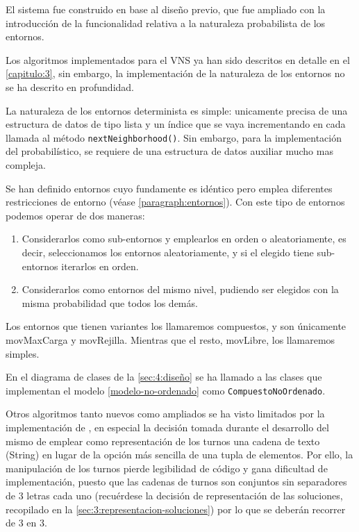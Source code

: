 El sistema fue construido en base al diseño previo, que fue ampliado con la introducción de la funcionalidad relativa a la naturaleza probabilista de los entornos.

Los algoritmos implementados para el VNS ya han sido descritos en detalle en el \autoref{capitulo:3}, sin embargo, la implementación de la naturaleza de los entornos no se ha descrito en profundidad.

La naturaleza de los entornos determinista es simple: unicamente precisa de una estructura de datos de tipo lista y un índice que se vaya incrementando en cada llamada al método \texttt{nextNeighborhood()}. Sin embargo, para la implementación del probabilístico, se requiere de una estructura de datos auxiliar mucho mas compleja.

Se han definido entornos cuyo fundamente es idéntico pero emplea diferentes restricciones de entorno (véase \autoref{paragraph:entornos}). Con este tipo de entornos podemos operar de dos maneras: 
\begin{enumerate}[label={(\Alph*)}]
	\item Considerarlos como sub-entornos y emplearlos en orden o aleatoriamente, es decir, seleccionamos los entornos aleatoriamente, y si el elegido tiene sub-entornos iterarlos en orden.
	\item \label{modelo-no-ordenado} Considerarlos como entornos del mismo nivel, pudiendo ser elegidos con la misma probabilidad que todos los demás.
\end{enumerate}

Los entornos que tienen variantes los llamaremos compuestos, y son únicamente movMaxCarga y movRejilla. Mientras que el resto, movLibre, los llamaremos simples.

En el diagrama de clases de la \autoref{sec:4:diseño} se ha llamado a las clases que implementan el modelo \ref{modelo-no-ordenado} como \texttt{CompuestoNoOrdenado}.

Otros algoritmos tanto nuevos como ampliados se ha visto limitados por la implementación de \legacy{}, en especial la decisión tomada durante el desarrollo del mismo de emplear como representación de los turnos una cadena de texto (String) en lugar de la opción más sencilla de una tupla de elementos. Por ello, la manipulación de los turnos pierde legibilidad de código y gana dificultad de implementación, puesto que las cadenas de turnos son conjuntos sin separadores de 3 letras cada uno (recuérdese la decisión de representación de las soluciones, recopilado en la \autoref{sec:3:representacion-soluciones}) por lo que se deberán recorrer de 3 en 3.

